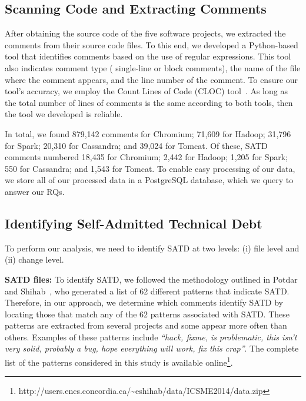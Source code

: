 
\subsection{Scanning Code and Extracting Comments}
After obtaining the source code of the five software projects, we extracted the comments from their source code files. To this end, we developed a Python-based tool that identifies comments based on the use of regular expressions. This tool also indicates comment type (\ie{} single-line or block comments), the name of the file where the comment appears, and the line number of the comment. To ensure our tool's accuracy, we employ the Count Lines of Code (CLOC) tool~\cite{cloc}. As long as the total number of lines of comments is the same according to both tools, then the tool we developed is reliable.

In total, we found 879,142 comments for Chromium; 71,609 for Hadoop; 31,796 for Spark; 20,310 for Cassandra; and 39,024 for Tomcat. Of these, SATD comments numbered 18,435 for Chromium; 2,442 for Hadoop; 1,205 for Spark; 550 for Cassandra; and 1,543 for Tomcat. To enable easy processing of our data, we store all of our processed data in a PostgreSQL database, which we query to answer our RQs.


\subsection{Identifying Self-Admitted Technical Debt}
\label{td}
To perform our analysis, we need to identify SATD at two levels: (i) file level and (ii) change level.



\noindent\textbf{SATD files:} To identify SATD, we followed the methodology outlined in Potdar and Shihab~\cite{ICSM_PotdarS14}, who generated a list of 62 different patterns that indicate SATD. Therefore, in our approach, we determine which comments identify SATD by locating those that match any of the 62 patterns associated with SATD. These patterns are extracted from several projects and some appear more often than others. Examples of these patterns include \textit{``hack, fixme, is problematic, this isn't very solid, probably a bug, hope everything will work, fix this crap''}. The complete list of the patterns considered in this study is available online\footnote{http://users.encs.concordia.ca/\textasciitilde eshihab/data/ICSME2014/data.zip}.

